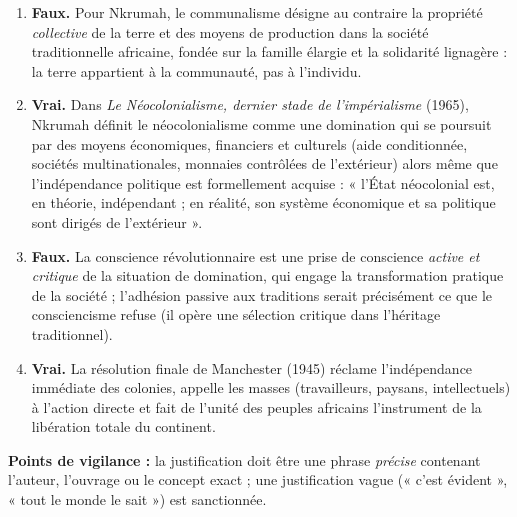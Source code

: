 \documentclass[11pt]{article}
\begin{document}
\begin{corrige}
\begin{enumerate}
\item \textbf{Faux.} Pour Nkrumah, le communalisme désigne au contraire la propriété \emph{collective} de la terre et des moyens de production dans la société traditionnelle africaine, fondée sur la famille élargie et la solidarité lignagère : la terre appartient à la communauté, pas à l'individu.
\item \textbf{Vrai.} Dans \emph{Le Néocolonialisme, dernier stade de l'impérialisme} (1965), Nkrumah définit le néocolonialisme comme une domination qui se poursuit par des moyens économiques, financiers et culturels (aide conditionnée, sociétés multinationales, monnaies contrôlées de l'extérieur) alors même que l'indépendance politique est formellement acquise : « l'État néocolonial est, en théorie, indépendant ; en réalité, son système économique et sa politique sont dirigés de l'extérieur ».
\item \textbf{Faux.} La conscience révolutionnaire est une prise de conscience \emph{active et critique} de la situation de domination, qui engage la transformation pratique de la société ; l'adhésion passive aux traditions serait précisément ce que le consciencisme refuse (il opère une sélection critique dans l'héritage traditionnel).
\item \textbf{Vrai.} La résolution finale de Manchester (1945) réclame l'indépendance immédiate des colonies, appelle les masses (travailleurs, paysans, intellectuels) à l'action directe et fait de l'unité des peuples africains l'instrument de la libération totale du continent.
\end{enumerate}

\textbf{Points de vigilance :} la justification doit être une phrase \emph{précise} contenant l'auteur, l'ouvrage ou le concept exact ; une justification vague (« c'est évident », « tout le monde le sait ») est sanctionnée.
\end{corrige}
\end{document}
